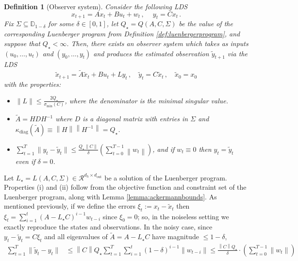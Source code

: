 \documentclass[11pt]{article}
\renewcommand{\subset}{\subseteq}
\def\R{{\mathcal R}}
\newcommand{\norm}[1]{\left\lVert#1\right\rVert}
\def\R{\ensuremath{\mathcal R}}
\newtheorem{definition}[theorem]{Definition}
\numberwithin{equation}{section}
\begin{document}
\begin{definition}[Observer system]
\label{prop:observersystem}
     Consider the following LDS
     \[
        x_{t+1} = Ax_t + Bu_t + w_t \,,\ \quad y_t = Cx_t\,.
     \]
     Fix $\Sigma \subset \mathbb{D}_{1-\delta}$ for some $\delta \in [0, 1]$, let $Q_\star = Q(A, C, \Sigma)$ be the value of the corresponding Luenberger program from Definition \ref{def:luenbergerprogram}, and suppose that $Q_\star < \infty$. Then, there exists an observer system which takes as inputs $(u_0, \dots, u_t)$ and $(y_0, \dots, y_t)$ and produces the estimated observation $\tilde{y}_{t+1}$ via the LDS
     \[
     \tilde{x}_{t+1} = \tilde{A}\tilde{x}_t + Bu_t + Ly_t\,, \quad \tilde{y}_t = C\tilde{x}_t\,, \quad \tilde{x}_0 = x_0
     \]
    with the properties:
    \begin{itemize}
        \item[(i)] $\|L\| \leq \frac{2Q_\star}{ \sigma_{\textrm{min}}(C)}$, where the denominator is the minimal singular value.
        \item[(ii)] $\tilde{A} = HDH^{-1}$ where $D$ is a diagonal matrix with entries in $\Sigma$ and $\kappa_{\textrm{diag}}(\tilde{A}) \equiv \norm{H}\norm{H^{-1}} = Q_\star$.
        \item[(iii)] $\sum_{t=1}^T\|y_t - \tilde{y}_t\| \leq \frac{Q_\star \|C\|}{\delta}\left(\sum_{t=0}^{T-1} \norm{w_t}\right)$, and if $w_t \equiv 0$ then $y_t = \tilde{y}_t$ even if $\delta = 0$.
    \end{itemize}
\end{definition}
Let $L_\star = L(A, C, \Sigma) \in \R^{d_{h} \times d_{\textrm{out}}}$ be a solution of the Luenberger program.
Properties (i) and (ii) follow from the objective function and constraint set of the Luenberger program, along with Lemma \ref{lemma:ackermannbounds}. As mentioned previously, if we define the errors $\xi_t := x_t - \tilde{x}_t$ then $\xi_t = \sum_{i=1}^t (A-L_\star C)^{i-1} w_{t-i}$ since $\xi_0 = 0$; so, in the noiseless setting we exactly reproduce the states and observations. In the noisy case, since $y_t - \tilde{y}_t = C\xi_t$ and all eigenvalues of $\tilde{A} = A-L_\star C$ have magnitude $\leq 1-\delta$, \begin{align*}
    \sum_{t=1}^T \|\tilde{y}_t - y_t\| &\leq \norm{C}Q_\star\sum_{t=1}^T \sum_{i = 1}^t (1-\delta)^{i-1} \|w_{t-i}\| \leq \frac{\norm{C}Q_\star}{\delta}\cdot  \left(\sum_{t=0}^{T-1} \|w_t\|\right)
    \end{align*}
\end{document}
